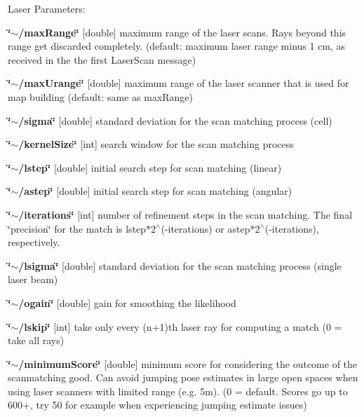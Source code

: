 Laser Parameters\+:
\begin{DoxyItemize}
\item {\bfseries \char`\"{}$\sim$/max\+Range\char`\"{}} {\bfseries }\mbox{[}double\mbox{]} maximum range of the laser scans. Rays beyond this range get discarded completely. (default\+: maximum laser range minus 1 cm, as received in the the first Laser\+Scan message)
\item {\bfseries \char`\"{}$\sim$/max\+Urange\char`\"{}} {\bfseries }\mbox{[}double\mbox{]} maximum range of the laser scanner that is used for map building (default\+: same as max\+Range)
\item {\bfseries \char`\"{}$\sim$/sigma\char`\"{}} {\bfseries }\mbox{[}double\mbox{]} standard deviation for the scan matching process (cell)
\item {\bfseries \char`\"{}$\sim$/kernel\+Size\char`\"{}} {\bfseries }\mbox{[}int\mbox{]} search window for the scan matching process
\item {\bfseries \char`\"{}$\sim$/lstep\char`\"{}} {\bfseries }\mbox{[}double\mbox{]} initial search step for scan matching (linear)
\item {\bfseries \char`\"{}$\sim$/astep\char`\"{}} {\bfseries }\mbox{[}double\mbox{]} initial search step for scan matching (angular)
\item {\bfseries \char`\"{}$\sim$/iterations\char`\"{}} {\bfseries }\mbox{[}int\mbox{]} number of refinement steps in the scan matching. The final \char`\"{}precision\char`\"{} for the match is lstep$\ast$2$^\wedge$(-\/iterations) or astep$\ast$2$^\wedge$(-\/iterations), respectively.
\item {\bfseries \char`\"{}$\sim$/lsigma\char`\"{}} {\bfseries }\mbox{[}double\mbox{]} standard deviation for the scan matching process (single laser beam)
\item {\bfseries \char`\"{}$\sim$/ogain\char`\"{}} {\bfseries }\mbox{[}double\mbox{]} gain for smoothing the likelihood
\item {\bfseries \char`\"{}$\sim$/lskip\char`\"{}} {\bfseries }\mbox{[}int\mbox{]} take only every (n+1)th laser ray for computing a match (0 = take all rays)
\item {\bfseries \char`\"{}$\sim$/minimum\+Score\char`\"{}} {\bfseries }\mbox{[}double\mbox{]} minimum score for considering the outcome of the scanmatching good. Can avoid \textquotesingle{}jumping\textquotesingle{} pose estimates in large open spaces when using laser scanners with limited range (e.\+g. 5m). (0 = default. Scores go up to 600+, try 50 for example when experiencing \textquotesingle{}jumping\textquotesingle{} estimate issues)
\end{DoxyItemize}

